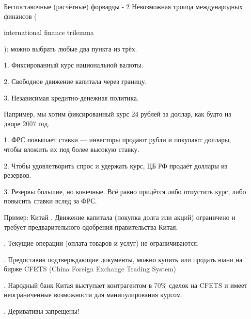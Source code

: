 \documentclass{beamer}
\newcommand{\en}[1]{\begin{otherlanguage}{english}#1\end{otherlanguage}}
\begin{document}
\begin{frame}{Беспоставочные (расчётные) форварды - 2}
\justify
Невозможная троица международных финансов (\en{international finance trilemma}): можно выбрать любые два пункта из трёх.

1. Фиксированный курс национальной валюты.

2. Свободное движение капитала через границу.

3. Независимая кредитно-денежная политика.

\justify
Например, мы хотим фиксированный курс 24 рублей за доллар, как будто на дворе 2007 год.

1. ФРС повышает ставки --- инвесторы продают рубли и покупают доллары, чтобы вложить их под более высокую ставку.

2. Чтобы удовлетворить спрос и удержать курс, ЦБ РФ продаёт доллары из резервов.

3. Резервы большие, но конечные. Всё равно придётся либо отпустить курс, либо повысить ставки вслед за ФРС.

\end{frame}



\begin{frame}{Пример: Китай}
. Движение капитала (покупка долга или акций) ограничено и требует предварительного одобрения правительства Китая.

. Текущие операции (оплата товаров и услуг) не ограничиваются. 

. Предоставив подтверждающие документы, можно купить или продать юани на бирже CFETS (China Foreign Exchange Trading System)

. Народный банк Китая выступает контрагентом в 70\% сделок на CFETS и имеет неограниченные возможности для манипулирования курсом.

. Деривативы запрещены!
\end{frame}
\end{document}
